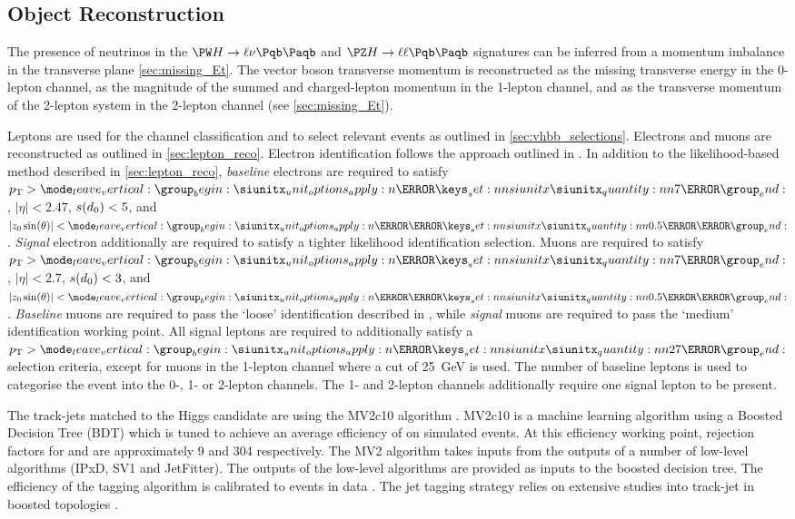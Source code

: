 \subsection{Object Reconstruction}\label{sec:vhbb_object_reco}

The presence of neutrinos in the $\Wboson \higgs \rightarrow \ell\nu \bbbar$ and $\Zboson \higgs \rightarrow \ell\ell \bbbar$ signatures can be inferred from a momentum imbalance in the transverse plane \cref{sec:missing_Et}.
The vector boson transverse momentum \ptv is reconstructed as the missing transverse energy \ETmiss in the 0-lepton channel, as the magnitude of the summed \vETmiss and charged-lepton momentum in the 1-lepton channel, and as the transverse momentum of the 2-lepton system in the 2-lepton channel (see \cref{sec:missing_Et}).

Leptons are used for the channel classification and to select relevant events as outlined in \cref{sec:vhbb_selections}.
Electrons and muons are reconstructed as outlined in \cref{sec:lepton_reco}.
Electron identification follows the approach outlined in .
In addition to the likelihood-based method described in \cref{sec:lepton_reco}, \textit{baseline} electrons are required to satisfy $\pt > \SI{7}{\GeV}$, $|\eta| < 2.47$, $s(d_0) < 5$, and $|\zzsth|< \SI{0.5}{\milli\meter}$.
\textit{Signal} electron additionally are required to satisfy a tighter likelihood identification selection.
Muons are required to satisfy $\pt > \SI{7}{\GeV}$, $|\eta| < 2.7$, $s(d_0) < 3$, and $|\zzsth|< \SI{0.5}{\milli\meter}$.
\textit{Baseline} muons are required to pass the `loose' identification described in , while \textit{signal} muons are required to pass the `medium' identification working point.
All signal leptons are required to additionally satisfy a $\pt > \SI{27}{\GeV}$ selection criteria, except for muons in the 1-lepton channel where a cut of \SI{25}{\GeV} is used.
The number of baseline leptons is used to categorise the event into the 0-, 1- or 2-lepton channels.
The 1- and 2-lepton channels additionally require one signal lepton to be present.

The track-jets matched to the Higgs candidate are \btagged using the MV2c10 \btagging algorithm \cite{ATL-PHYS-PUB-2015-022,FTAG-2018-01,ATL-PHYS-PUB-2017-013}.
MV2c10 is a machine learning algorithm using a Boosted Decision Tree (BDT) which is tuned to achieve an average \bjet efficiency of  on simulated \ttbar events.
At this efficiency working point, rejection factors for \cjets and \ljets are approximately 9 and 304 respectively.
The MV2 algorithm takes inputs from the outputs of a number of low-level algorithms (IPxD, SV1 and JetFitter).
The outputs of the low-level algorithms are provided as inputs to the boosted decision tree.
The efficiency of the tagging algorithm is calibrated to events in data \cite{PERF-2016-05,ATLAS-CONF-2018-006,ATLAS-CONF-2018-001}.
The jet tagging strategy relies on extensive studies into track-jet \btagging in boosted topologies \cite{ATL-PHYS-PUB-2014-013, PERF-2017-04}.

